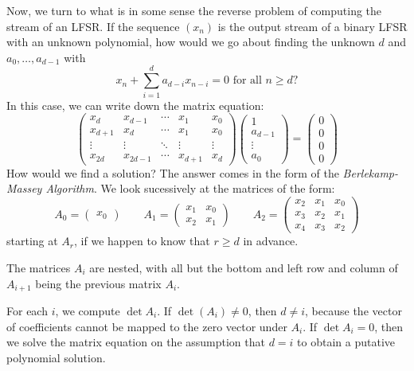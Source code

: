 \documentclass{article}
\begin{document}
Now, we turn to what is in some sense the reverse problem of computing the stream of an LFSR. If the sequence $(x_n)$ is the output stream of a binary LFSR with an unknown polynomial, how would we go about finding the unknown $d$ and $a_0, \dots, a_{d-1}$ with
\[
x_n + \sum_{i=1}^d a_{d-i} x_{n-i} = 0 \text{ for all $n \geq d$}?
\]
In this case, we can write down the matrix equation:
\[
\begin{pmatrix}
	x_{d} & x_{d-1} & \cdots & x_1 & x_0 \\
	x_{d+1} & x_{d} & \cdots & x_1 & x_0 \\
	\vdots & \vdots & \ddots & \vdots & \vdots \\
	x_{2d} & x_{2d-1} & \cdots & x_{d+1} & x_{d}
\end{pmatrix}
\begin{pmatrix}
	1 \\ a_{d-1} \\ \vdots \\ a_0
\end{pmatrix}
=
\begin{pmatrix}
	0 \\ 0 \\ 0 \\ 0
\end{pmatrix}
\]
How would we find a solution?
The answer comes in the form of the \textit{Berlekamp-Massey Algorithm}. We look sucessively at the matrices of the form:
\[
A_0 = \begin{pmatrix}
	x_0
\end{pmatrix}
\qquad
A_1 = \begin{pmatrix}
	x_1 & x_0 \\
	x_2 & x_1
\end{pmatrix}
\qquad
A_2 = \begin{pmatrix}
	x_2 & x_1 & x_0 \\
	x_3 & x_2 & x_1 \\
	x_4 & x_3 & x_2
\end{pmatrix}
\]
starting at $A_r$, if we happen to know that $r \geq d$ in advance.

\begin{note}
	The matrices $A_i$ are nested, with all but the bottom and left row and column of $A_{i+1}$ being the previous matrix $A_i$.
\end{note}

For each $i$, we compute $\det A_i$. If $\det(A_i) \neq 0$, then $d \neq i$, because the vector of coefficients cannot be mapped to the zero vector under $A_i$. If $\det A_i = 0$, then we solve the matrix equation on the assumption that $d = i$ to obtain a putative polynomial solution.
\end{document}
